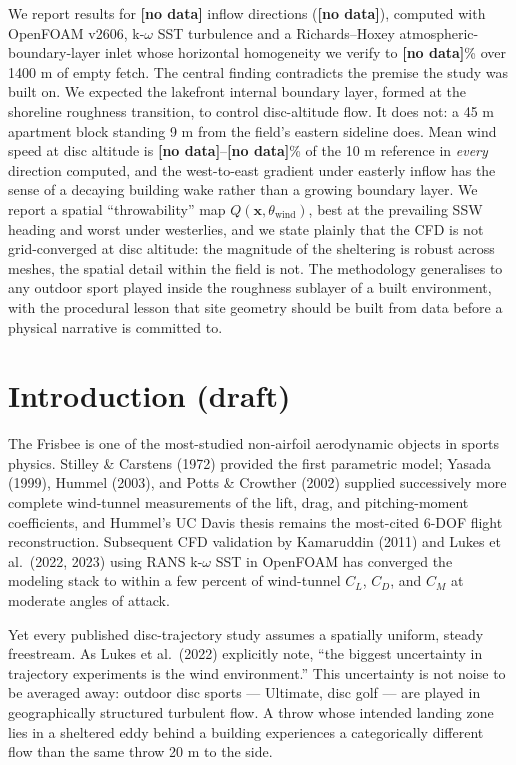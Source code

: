 \documentclass[11pt,letterpaper]{article}
\newcommand{\MISSINGNUM}{\textbf{\color{red}[no data]}}%
\newcommand{\ABLdrift}{\MISSINGNUM}\newcommand{\ABLverdict}{\MISSINGNUM}%
\newcommand{\UfieldFracMin}{\MISSINGNUM}\newcommand{\UfieldFracMax}{\MISSINGNUM}%
\newcommand{\Ndirections}{\MISSINGNUM}\newcommand{\DirectionList}{\MISSINGNUM}%
\begin{document}
We report results for \Ndirections{} inflow directions (\DirectionList),
computed with OpenFOAM v2606, k-$\omega$ SST turbulence and a Richards--Hoxey
atmospheric-boundary-layer inlet whose horizontal homogeneity we verify to
\ABLdrift\% over 1400 m of empty fetch. The central finding contradicts the
premise the study was built on. We expected the lakefront internal boundary
layer, formed at the shoreline roughness transition, to control disc-altitude
flow. It does not: a 45 m apartment block standing 9 m from the field's eastern
sideline does. Mean wind speed at disc altitude is \UfieldFracMin--\UfieldFracMax\% of the
10 m reference in \emph{every} direction computed, and the west-to-east gradient
under easterly inflow has the sense of a decaying building wake rather than a
growing boundary layer. We report a spatial ``throwability'' map
$Q(\mathbf{x}, \theta_{\text{wind}})$, best at the prevailing SSW heading and
worst under westerlies, and we state plainly that the CFD is not grid-converged
at disc altitude: the magnitude of the sheltering is robust across meshes, the
spatial detail within the field is not. The methodology generalises to any
outdoor sport played inside the roughness sublayer of a built environment, with
the procedural lesson that site geometry should be built from data before a
physical narrative is committed to.

\section{Introduction (draft)}

The Frisbee is one of the most-studied non-airfoil aerodynamic objects in sports physics. Stilley \& Carstens (1972) provided the first parametric model; Yasada (1999), Hummel (2003), and Potts \& Crowther (2002) supplied successively more complete wind-tunnel measurements of the lift, drag, and pitching-moment coefficients, and Hummel's UC Davis thesis remains the most-cited 6-DOF flight reconstruction. Subsequent CFD validation by Kamaruddin (2011) and Lukes et al.\ (2022, 2023) using RANS k-$\omega$ SST in OpenFOAM has converged the modeling stack to within a few percent of wind-tunnel $C_L$, $C_D$, and $C_M$ at moderate angles of attack.

Yet every published disc-trajectory study assumes a spatially uniform, steady freestream. As Lukes et al.\ (2022) explicitly note, ``the biggest uncertainty in trajectory experiments is the wind environment.'' This uncertainty is not noise to be averaged away: outdoor disc sports --- Ultimate, disc golf --- are played in geographically structured turbulent flow. A throw whose intended landing zone lies in a sheltered eddy behind a building experiences a categorically different flow than the same throw 20 m to the side.
\end{document}
